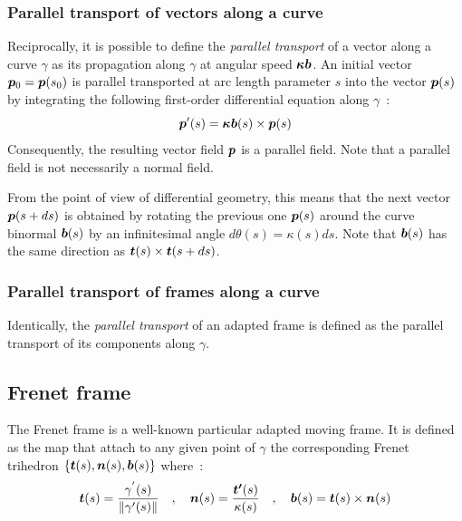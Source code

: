 \subsubsection{Parallel transport of vectors along a curve}
Reciprocally, it is possible to define the \emph{parallel transport} of a vector along a curve $\gamma$ as its propagation along $\gamma$ at angular speed $\boldsymbol{\kappa b}$. An initial vector $\boldsymbol{p}_0 = \boldsymbol{p}(s_0)$ is parallel transported at arc length parameter $s$ into the vector $\boldsymbol{p}(s)$ by integrating the following first-order differential equation along $\gamma$~:
\begin{equation}
	\boldsymbol{p}'(s) = \boldsymbol{\kappa b}(s) \times  \boldsymbol{p}(s)
\end{equation}
Consequently, the resulting vector field $\boldsymbol{p}$ is a parallel field. Note that a parallel field is not necessarily a normal field. 

From the point of view of differential geometry, this means that the next vector $\boldsymbol{p}(s+ds)$ is obtained by rotating the previous one $\boldsymbol{p}(s)$ around the curve binormal $\boldsymbol{b}(s)$ by an infinitesimal angle $d\theta(s) = \kappa(s) ds$. Note that $\boldsymbol{b}(s)$ has the same direction as $\boldsymbol{t}(s) \times \boldsymbol{t}(s+ds)$.

\subsubsection{Parallel transport of frames along a curve}
Identically, the \emph{parallel transport} of an adapted frame is defined as the parallel transport of its components along $\gamma$.

%

\subsection{Frenet frame}
\label{sec:ff}

The Frenet frame is a well-known particular adapted moving frame. It is defined as the map that attach to any given point of $\gamma$ the corresponding Frenet trihedron $\{\boldsymbol{t}(s),\boldsymbol{n}(s),\boldsymbol{b}(s)\}$ where~:
\begin{gather}
\boldsymbol{t}(s) = \frac{\gamma^{'}(s)}{\lVert\gamma'(s)\rVert}
\quad,\quad
\boldsymbol{n}(s) = \frac{\boldsymbol{t'}(s)}{\kappa(s)}
\quad,\quad
\boldsymbol{b}(s)= \boldsymbol{t}(s)\times\boldsymbol{n}(s)
\end{gather}

